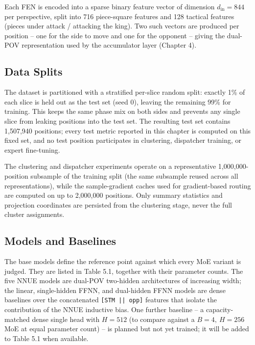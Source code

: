 Each FEN is encoded into a sparse binary feature vector of dimension $d_{\text{in}} = 844$ per perspective, split into 716 piece-square features and 128 tactical features (pieces under attack / attacking the king). Two such vectors are produced per position -- one for the side to move and one for the opponent -- giving the dual-POV representation used by the accumulator layer (Chapter 4).

\subsection{Data Splits}

The dataset is partitioned with a stratified per-slice random split: exactly 1\% of each slice is held out as the test set (seed 0), leaving the remaining 99\% for training. This keeps the same phase mix on both sides and prevents any single slice from leaking positions into the test set. The resulting test set contains 1,507,940 positions; every test metric reported in this chapter is computed on this fixed set, and no test position participates in clustering, dispatcher training, or expert fine-tuning.

The clustering and dispatcher experiments operate on a representative 1,000,000-position subsample of the training split (the same subsample reused across all representations), while the sample-gradient caches used for gradient-based routing are computed on up to 2,000,000 positions. Only summary statistics and projection coordinates are persisted from the clustering stage, never the full cluster assignments.

\subsection{Models and Baselines}

The base models define the reference point against which every MoE variant is judged. They are listed in Table 5.1, together with their parameter counts. The five NNUE models are dual-POV two-hidden architectures of increasing width; the linear, single-hidden FFNN, and dual-hidden FFNN models are dense baselines over the concatenated \texttt{[STM || opp]} features that isolate the contribution of the NNUE inductive bias. One further baseline -- a capacity-matched dense single head with $H{=}512$ (to compare against a $B{=}4,\ H{=}256$ MoE at equal parameter count) -- is planned but not yet trained; it will be added to Table 5.1 when available.

